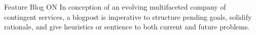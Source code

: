\documentclass{article}
\begin{document}
\frontmatter
{Feature}
{Blog}
{ON}
{In conception of an evolving multifaceted company of contingent services, a blogpost is imperative to structure pending goals, solidify rationale, and give heuristics or sentience to both current and future problems.}

\strategy
{}
{}
{}
{}

\deploy
{}
{}

\report
{}
\end{document}
